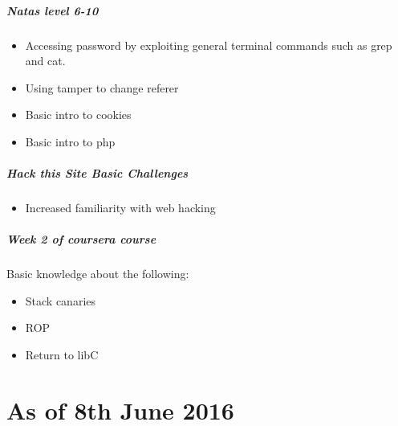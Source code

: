 \documentclass{article}
\begin{document}
\subparagraph{Natas level 6-10}
    \begin{itemize}
    \item Accessing password by exploiting general terminal commands such as grep and cat.
    \item Using tamper to change referer 
    \item Basic intro to cookies
    \item Basic intro to php
    \end{itemize}    
\subparagraph{Hack this Site Basic Challenges}
    \begin{itemize}
    \item Increased familiarity with web hacking
    \end{itemize} 
\subparagraph{Week 2 of coursera course}
    Basic knowledge about the following:
    \begin{itemize}
    \item Stack canaries
    \item ROP
    \item Return to libC
    \end{itemize} 

\newpage
\section*{As of 8th June 2016}
\end{document}
